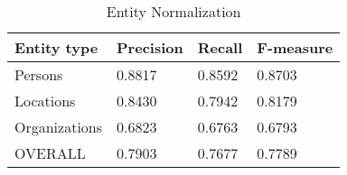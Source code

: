 \begin{table}[ht]
\centering
\caption{Entity Normalization}
\label{factrueval_3_2}
\begin{tabular}{|l|l|l|l|}
\hline
Entity type    & Precision      & Recall      & F-measure     \\ \hline
Persons     & 0.8817 & 0.8592 & 0.8703 \\ \hline
Locations     & 0.8430 & 0.7942 & 0.8179 \\ \hline
Organizations     & 0.6823 & 0.6763 & 0.6793 \\ \hline
OVERALL & 0.7903 & 0.7677 & 0.7789 \\ \hline
\end{tabular}
\end{table}